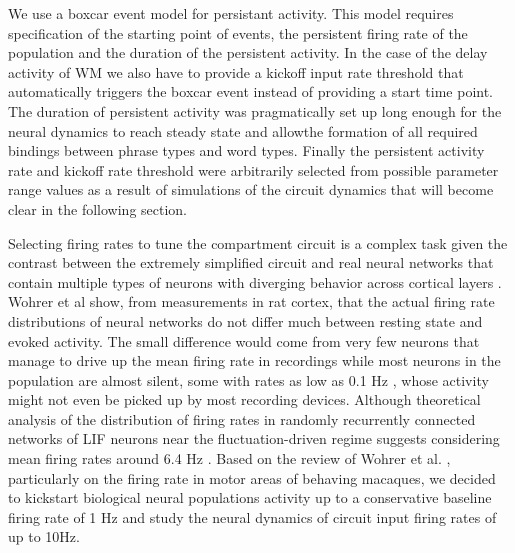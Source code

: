 \documentclass[10pt]{article}
\begin{document}
We use a boxcar event model for persistant activity. This model requires specification of the starting point of events, the persistent firing rate of the population and the duration of the persistent activity.
In the case of the delay activity of WM we also have to provide a kickoff input rate threshold that automatically triggers the boxcar event instead of providing a start time point.
The duration of persistent activity was pragmatically set up long enough for the neural dynamics to reach steady state and allowthe formation of  all required bindings between phrase types and 
word types.
Finally the persistent activity rate and kickoff rate threshold were arbitrarily selected from possible parameter range values as a result of simulations of the circuit dynamics that will become clear in the following section.

Selecting firing rates to tune the compartment circuit is a complex task given the contrast between the extremely simplified circuit and real neural networks that contain multiple types of neurons with diverging behavior across cortical layers \cite{Wohrer_2013}.
Wohrer et al \cite{Wohrer_2013} show, from measurements in rat cortex, that the actual firing rate distributions of neural networks do not differ much between resting state and evoked activity.
The small difference would come from very few neurons that manage to drive up the mean firing rate in recordings while most neurons in the population are almost silent, some with rates as low as 0.1 Hz \cite{Kerr_2005}, whose activity might not even be picked up by most recording devices.
Although theoretical analysis of the distribution of firing rates in randomly recurrently connected networks of LIF neurons near the fluctuation-driven regime suggests considering mean firing rates around 6.4 Hz \cite{Roxin_2011}.
Based on the review of Wohrer et al. \cite{Wohrer_2013}, particularly on the firing rate in motor areas of behaving macaques, we decided to kickstart biological neural populations activity up to a conservative baseline firing rate of 1 Hz and study the neural dynamics of circuit input firing rates of up to 10Hz.
\end{document}
